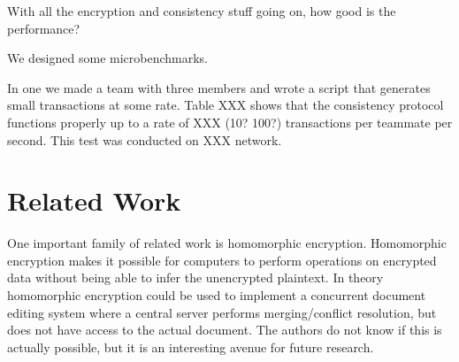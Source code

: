 \documentclass[pldi-cameraready,10pt]{sigplanconf-pldi16}
\begin{document}
With all the encryption and consistency stuff going on, how good is the performance?

We designed some microbenchmarks.

In one we made a team with three members and wrote a script that generates small transactions at some rate.
Table XXX shows that the consistency protocol functions properly up to a rate of XXX (10? 100?) transactions per teammate per second.
This test was conducted on XXX network.

\section{Related Work}

One important family of related work is homomorphic encryption.
Homomorphic encryption makes it possible for computers to perform operations on encrypted data without being able to infer the unencrypted plaintext.
In theory homomorphic encryption could be used to implement a concurrent document editing system where a central server performs merging/conflict resolution, but does not have access to the actual document.
The authors do not know if this is actually possible, but it is an interesting avenue for future research.
\end{document}
